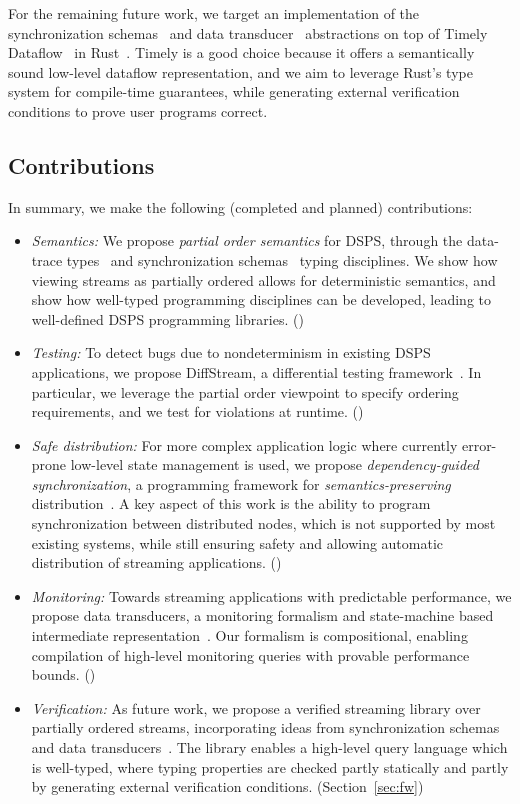 For the remaining future work, we target an implementation of the synchronization schemas~ and data transducer~ abstractions on top of Timely Dataflow~\cite{Timely,Naiad2013} in Rust~\cite{RustLang}.
Timely is a good choice because it offers a semantically sound low-level dataflow representation,
and we aim to leverage Rust's type system for compile-time guarantees,
while generating external verification conditions to prove user programs correct.

\subsection{Contributions}

In summary, we make the following (completed and planned) contributions:

\begin{itemize}
\item
\emph{Semantics:}
We propose \emph{partial order semantics} for DSPS,
through the data-trace types~ and synchronization schemas~ typing disciplines.
We show how viewing streams as partially ordered allows for deterministic semantics,
and show how well-typed programming disciplines can be developed,
leading to well-defined DSPS programming libraries.
()

\item
\emph{Testing:}
To detect bugs due to nondeterminism in existing DSPS applications,
we propose DiffStream, a differential testing framework~.
In particular, we leverage the partial order viewpoint to specify
ordering requirements, and we test for violations at runtime.
()

\item
\emph{Safe distribution:}
For more complex application logic where currently error-prone
low-level state management is used,
we propose \emph{dependency-guided synchronization},
a programming framework for \emph{semantics-preserving} distribution~.
A key aspect of this work is the ability to program
synchronization between distributed nodes, which is not supported
by most existing systems,
while still ensuring safety and allowing automatic distribution
of streaming applications.
()

\item
\emph{Monitoring:}
Towards streaming applications with predictable performance,
we propose data transducers, a monitoring formalism and state-machine based intermediate representation~.
Our formalism is compositional, enabling compilation of high-level
monitoring queries with provable performance bounds.
()

\item
\emph{Verification:}
As future work, we propose a verified streaming library
over partially ordered streams, incorporating ideas from synchronization schemas~ and data transducers~.
The library enables a high-level query language which is well-typed,
where typing properties are checked partly statically and partly by
generating external verification conditions.
(Section~\ref{sec:fw})
\end{itemize}
